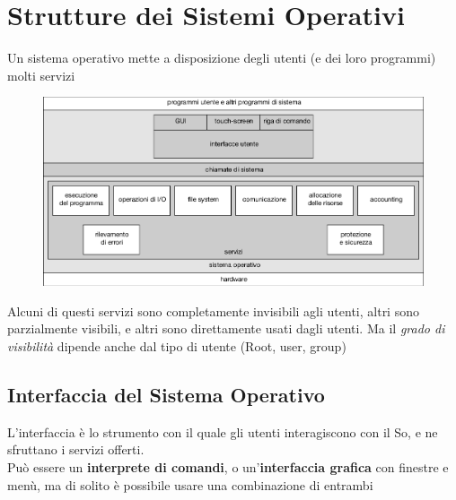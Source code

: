 \chapter{Strutture dei Sistemi Operativi}
Un sistema operativo mette a disposizione degli utenti (e dei loro programmi) molti servizi 
\begin{figure}[h]
    \centering
    \includegraphics[width=0.5\linewidth]{images/Strutture-di-SO.png}
\end{figure}

Alcuni di questi servizi sono completamente invisibili agli utenti, altri sono parzialmente visibili, e altri sono direttamente usati dagli utenti.
Ma il \textit{grado di visibilità} dipende anche dal tipo di utente (Root, user, group)


\section{Interfaccia del Sistema Operativo}
L'interfaccia è lo strumento con il quale gli utenti interagiscono con il So, e ne sfruttano i servizi offerti.\\
Può essere un \textbf{interprete di comandi}, o un'\textbf{interfaccia grafica} con finestre e menù, ma di solito è possibile usare una combinazione di entrambi

